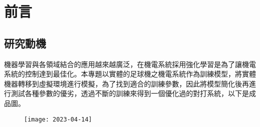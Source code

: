 \chapter{前言}
\renewcommand{\baselinestretch}{10.0} %
\setcounter{page}{1}  %
\fontsize{14pt}{2.5pt}\sectionef
\section{研究動機}
機器學習與各領域結合的應用越來越廣泛，在機電系統採用強化學習是為了讓機電系統的控制達到最佳化。本專題以實體的足球機之機電系統作為訓練模型，將實體機器轉移到虛擬環境進行模擬，為了找到適合的訓練參數，因此將模型簡化後再進行測試各種參數的優劣，透過不斷的訓練來得到一個優化過的對打系統，以下是成品圖。\\

\begin{figure}[hbt!]
\begin{center}
\texttt{[image: 2023-04-14]}
\end{center}
\end{figure}
\begin{figure}[hbt!]
\begin{center}
\end{center}
\end{figure}
